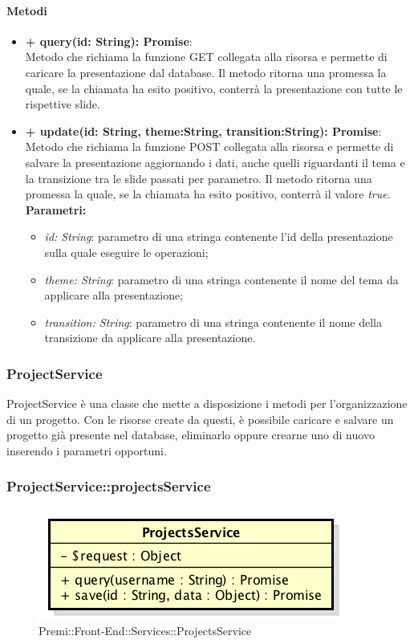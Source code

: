 		\paragraph{Metodi}
		\begin{itemize}
			\item \textbf{+ query(id: String): Promise}:\\
			Metodo che richiama la funzione GET collegata alla risorsa e permette di caricare la presentazione dal database. Il metodo ritorna una promessa la quale, se la chiamata ha esito positivo, conterrà la presentazione con tutte le rispettive slide.\\
			\item \textbf{+ update(id: String, theme:String, transition:String): Promise}:\\
			Metodo che richiama la funzione POST collegata alla risorsa e permette di salvare la presentazione aggiornando i dati, anche quelli riguardanti il tema e la transizione tra le slide passati per parametro. Il metodo ritorna una promessa la quale, se la chiamata ha esito positivo, conterrà il valore \textit{true}.\\
			\textbf{Parametri:}\\
			\begin{itemize}
				\item \textit{id: String}: parametro di una stringa contenente l'id della presentazione sulla quale eseguire le operazioni;
				\item \textit{theme: String}: parametro di una stringa contenente il nome del tema da applicare alla presentazione;
				\item \textit{transition: String}: parametro di una stringa contenente il nome della transizione da applicare alla presentazione.
			\end{itemize}
		\end{itemize}
\newpage


\subsubsection{ProjectService}
ProjectService è una classe che mette a disposizione i metodi per l'organizzazione di un progetto. Con le risorse create da questi, è possibile caricare e salvare un progetto già presente nel database, eliminarlo oppure crearne uno di nuovo inserendo i parametri opportuni.

		\subsubsection{ProjectService::projectsService}
		\begin{figure}[h]
			\centering
				\includegraphics[width=0.4\linewidth]{img/premi_front_end_services_projectsservice}
			\caption[Premi::Front-End::Services::ProjectsService]{Premi::Front-End::Services::ProjectsService}
		\end{figure}
		
